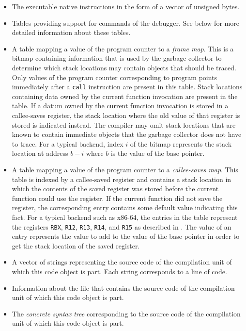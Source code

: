 \begin{itemize}
\item The executable native instructions in the form of a vector of
  unsigned bytes.
\item Tables providing support for commands of the debugger.  See
  below for more detailed information about these tables.
\item A table mapping a value of the program counter to a \emph{frame
  map}.  This is a bitmap containing information that is used by the
  garbage collector to determine which stack locations may contain
  \commonlisp{} objects that should be traced.  Only values of the
  program counter corresponding to program points immediately after a
  \texttt{call} instruction are present in this table.  Stack
  locations containing data owned by the current function invocation
  are present in the table.  If a datum owned by the current function
  invocation is stored in a callee-saves register, the stack location
  where the old value of that register is stored is indicated instead.
  The compiler may omit stack locations that are known to contain
  immediate \commonlisp{} objects that the garbage collector does not
  have to trace.  For a typical backend, index $i$ of the bitmap
  represents the stack location at address $b-i$ where $b$ is the
  value of the base pointer.
\item A table mapping a value of the program counter to a
  \emph{callee-saves map}.  This table is indexed by a callee-saved
  register and contains a stack location in which the contents of the
  saved register was stored before the current function could use the
  register.  If the current function did not save the register, the
  corresponding entry contains some default value indicating this
  fact.  For a typical backend such as x86-64, the entries in the
  table represent the registers \texttt{RBX}, \texttt{R12},
  \texttt{R13}, \texttt{R14}, and \texttt{R15} as described in
  .  The value of an entry
  represents the value to add to the value of the base pointer in order
  to get the stack location of the saved register.
\item A vector of strings representing the source code of the
  compilation unit of which this code object is part.  Each string
  corresponds to a line of code.
\item Information about the file that contains the source code of the
  compilation unit of which this code object is part.
\item The \emph{concrete syntax tree} corresponding to the source code
  of the compilation unit of which this code object is part.
\end{itemize}

